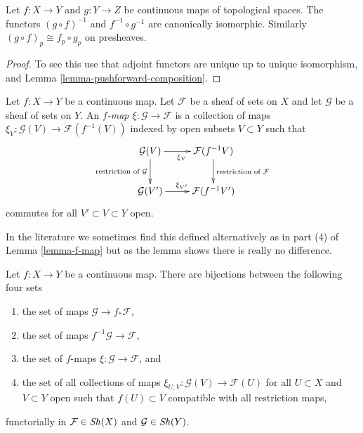 \begin{lemma}
\label{lemma-pullback-composition}
Let $f : X \to Y$ and $g : Y \to Z$ be continuous maps
of topological spaces. The functors $(g \circ f)^{-1}$
and $f^{-1} \circ g^{-1}$ are canonically isomorphic.
Similarly $(g \circ f)_p \cong f_p \circ g_p$ on
presheaves.
\end{lemma}

\begin{proof}
To see this
use that adjoint functors are unique up to unique isomorphism,
and Lemma \ref{lemma-pushforward-composition}.
\end{proof}

\begin{definition}
\label{definition-f-map}
Let $f : X \to Y$ be a continuous map.
Let $\mathcal{F}$ be a sheaf of sets on $X$ and
let $\mathcal{G}$ be a sheaf of sets on $Y$.
An {\it $f$-map $\xi : \mathcal{G} \to \mathcal{F}$}
is a collection of maps
$\xi_V : \mathcal{G}(V) \to \mathcal{F}(f^{-1}(V))$
indexed by open subsets $V \subset Y$ such that
$$
\xymatrix{
\mathcal{G}(V) \ar[r]_{\xi_V} \ar[d]_{\text{restriction of }\mathcal{G}} &
\mathcal{F}(f^{-1}V) \ar[d]^{\text{restriction of }\mathcal{F}} \\
\mathcal{G}(V') \ar[r]^{\xi_{V'}} &
\mathcal{F}(f^{-1}V')
}
$$
commutes for all $V' \subset V \subset Y$ open.
\end{definition}

\noindent
In the literature we sometimes find this defined alternatively
as in part (4) of Lemma \ref{lemma-f-map} but as the lemma shows there
is really no difference.

\begin{lemma}
\label{lemma-f-map}
Let $f : X \to Y$ be a continuous map.
There are bijections between the following four sets
\begin{enumerate}
\item the set of maps $\mathcal{G} \to f_*\mathcal{F}$,
\item the set of maps $f^{-1}\mathcal{G} \to \mathcal{F}$,
\item the set of $f$-maps $\xi : \mathcal{G} \to \mathcal{F}$, and
\item the set of all collections of maps
$\xi_{U, V} : \mathcal{G}(V) \to \mathcal{F}(U)$ for all
$U \subset X$ and $V \subset Y$ open such that $f(U) \subset V$
compatible with all restriction maps,
\end{enumerate}
functorially in $\mathcal{F} \in \mathop{\mathit{Sh}}\nolimits(X)$ and $\mathcal{G} \in \mathop{\mathit{Sh}}\nolimits(Y)$.
\end{lemma}

